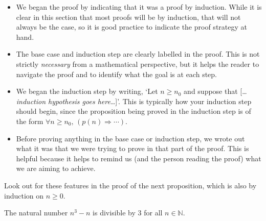\begin{itemize}
\item We began the proof by indicating that it was a proof by induction. While it is clear in this section that most proofs will be by induction, that will not always be the case, so it is good practice to indicate the proof strategy at hand.
\item The base case and induction step are clearly labelled in the proof. This is not strictly \textit{necessary} from a mathematical perspective, but it helps the reader to navigate the proof and to identify what the goal is at each step.
\item We began the induction step by writing, `Let $n \ge n_0$ and suppose that [\dots{}\textit{induction hypothesis goes here}\dots{}]'. This is typically how your induction step should begin, since the proposition being proved in the induction step is of the form $\forall n \ge n_0,\, (p(n) \Rightarrow \cdots)$.
\item Before proving anything in the base case or induction step, we wrote out what it was that we were trying to prove in that part of the proof. This is helpful because it helps to remind us (and the person reading the proof) what we are aiming to achieve.
\end{itemize}

Look out for these features in the proof of the next proposition, which is also by induction on $n \ge 0$.

\begin{proposition}
The natural number $n^3-n$ is divisible by $3$ for all $n \in \mathbb{N}$.
\end{proposition}

